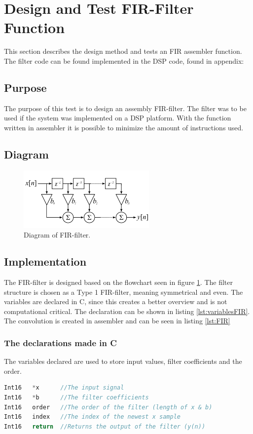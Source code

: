 \section{Design and Test FIR-Filter Function}

This section describes the design method and tests an FIR assembler function. The filter code can be found implemented in the DSP code, found in appendix: \


\subsection{Purpose}
The purpose of this test is to design an assembly FIR-filter. The filter was to be used if the system was implemented on a DSP platform. With the function written in assembler it is possible to minimize the amount of instructions used. 


\subsection{Diagram}

\begin{figure}[H]
	\centering
	\includegraphics[width=0.6\textwidth]{../Journal/Code/FIRfilter}
	\caption{Diagram of FIR-filter\cite{FIRWiki}.}
	\label{Fig:FIR_filter2}
\end{figure}

\subsection{Implementation}
The FIR-filter is designed based on the flowchart seen in figure \ref{Fig:FIR_filter2}. The filter structure is chosen as a Type 1 FIR-filter, meaning symmetrical and even. The variables are declared in C, since this creates a better overview and is not computational critical. The declaration can be shown in listing \ref{lst:variablesFIR}. The convolution is created in assembler and can be seen in listing \ref{lst:FIR}

\subsubsection{The declarations made in C}
The variables declared are used to store input values, filter coefficients and the order. 
\begin{lstlisting}[language={C},caption={declaration of the needed variables.}, label={lst:variablesFIR} ]
Int16 	*x 		//The input signal
Int16	*b		//The filter coefficients
Int16	order	//The order of the filter (length of x & b)
Int16	index	//The index of the newest x sample
Int16	return	//Returns the output of the filter (y(n))
\end{lstlisting}

